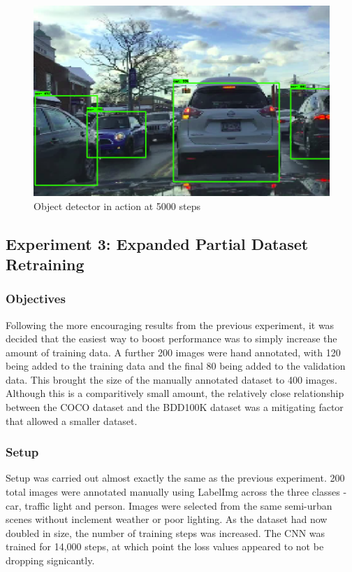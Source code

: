 \documentclass[12pt]{report}
\begin{document}
\vspace{0.5cm}
\begin{figure}[ht!]
	\centering
	\includegraphics[width=15cm]{classes-smalldata-5k}
	\caption{Object detector in action at 5000 steps}
	\label{fig:class-smalldata-5k}
\end{figure}

\clearpage
\subsection{Experiment 3: Expanded Partial Dataset Retraining}
\subsubsection*{Objectives}
\begin{flushleft}
Following the more encouraging results from the previous experiment, it was decided that the easiest way to boost performance was to simply increase the amount of training data. A further 200 images were hand annotated, with 120 being added to the training data and the final 80 being added to the validation data. This brought the size of the manually annotated dataset to 400 images. Although this is a comparitively small amount, the relatively close relationship between the COCO dataset and the BDD100K dataset was a mitigating factor that allowed a smaller dataset.
\end{flushleft}

\subsubsection*{Setup}
\begin{flushleft}
Setup was carried out almost exactly the same as the previous experiment. 200 total images were annotated manually using LabelImg across the three classes - car, traffic light and person. Images were selected from the same semi-urban scenes without inclement weather or poor lighting. As the dataset had now doubled in size, the number of training steps was increased. The CNN was trained for 14,000 steps, at which point the loss values appeared to not be dropping signicantly.
\end{flushleft}
\end{document}
